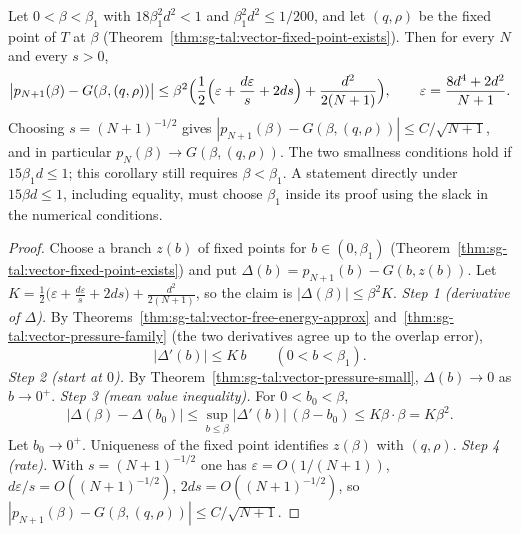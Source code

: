 \begin{theorem}\label{thm:sg-tal:vector-free-energy-limit}
\leanok
{}
Let $0<\beta<\beta_1$ with $18\beta_1^2d^2<1$ and $\beta_1^2d^2\le1/200$, and let $(q,\rho)$ be the fixed point of $T$ at $\beta$ (Theorem~\ref{thm:sg-tal:vector-fixed-point-exists}). Then for every $N$ and every $s>0$,
\[
\bigl|p_{N+1}(\beta)-G(\beta,(q,\rho))\bigr|\le\beta^2\Bigl(\frac12\Bigl(\varepsilon+\frac{d\varepsilon}s+2ds\Bigr)+\frac{d^2}{2(N+1)}\Bigr),\qquad\varepsilon=\frac{8d^4+2d^2}{N+1}.
\]
Choosing $s=(N+1)^{-1/2}$ gives $|p_{N+1}(\beta)-G(\beta,(q,\rho))|\le C/\sqrt{N+1}$, and in particular $p_N(\beta)\to G(\beta,(q,\rho))$. The two smallness conditions hold if $15\beta_1d\le1$; this corollary still requires $\beta<\beta_1$. A statement directly under $15\beta d\le1$, including equality, must choose $\beta_1$ inside its proof using the slack in the numerical conditions.
\end{theorem}
\begin{proof}
\leanok
Choose a branch $z(b)$ of fixed points for $b\in(0,\beta_1)$ (Theorem~\ref{thm:sg-tal:vector-fixed-point-exists}) and put $\Delta(b)=p_{N+1}(b)-G(b,z(b))$. Let $K=\frac12\big(\varepsilon+\frac{d\varepsilon}s+2ds\big)+\frac{d^2}{2(N+1)}$, so the claim is $|\Delta(\beta)|\le\beta^2K$.
\emph{Step 1 (derivative of $\Delta$).} By Theorems~\ref{thm:sg-tal:vector-free-energy-approx} and~\ref{thm:sg-tal:vector-pressure-family} (the two derivatives agree up to the overlap error),
\[
|\Delta'(b)|\le K\,b\qquad(0<b<\beta_1).
\]
\emph{Step 2 (start at $0$).} By Theorem~\ref{thm:sg-tal:vector-pressure-small}, $\Delta(b)\to0$ as $b\to0^+$.
\emph{Step 3 (mean value inequality).} For $0<b_0<\beta$,
\[
|\Delta(\beta)-\Delta(b_0)|\le\sup_{b\le\beta}|\Delta'(b)|\,(\beta-b_0)\le K\beta\cdot\beta=K\beta^2 .
\]
Let $b_0\to0^+$. Uniqueness of the fixed point identifies $z(\beta)$ with $(q,\rho)$.
\emph{Step 4 (rate).} With $s=(N+1)^{-1/2}$ one has $\varepsilon=O(1/(N+1))$, $d\varepsilon/s=O((N+1)^{-1/2})$, $2ds=O((N+1)^{-1/2})$, so $|p_{N+1}(\beta)-G(\beta,(q,\rho))|\le C/\sqrt{N+1}$.
\end{proof}

